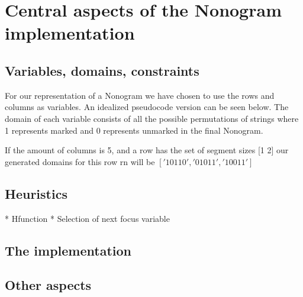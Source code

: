 
\section{Central aspects of the Nonogram implementation}
\subsection{Variables, domains, constraints}
For our representation of a Nonogram we have chosen to
use the rows and columns as variables. An idealized pseudocode
version can be seen below. The domain of each variable consists
of all the possible permutations of strings where 1 represents
marked and 0 represents unmarked in the final Nonogram.

If the amount of columns is 5, and a row has the set of segment
sizes [1 2] our generated domains for this row rn will be
$ ['10110','01011', '10011'] $



\subsection{Heuristics}
* H\-function
* Selection of next focus variable

\subsection*{The implementation}

\subsection{Other aspects}